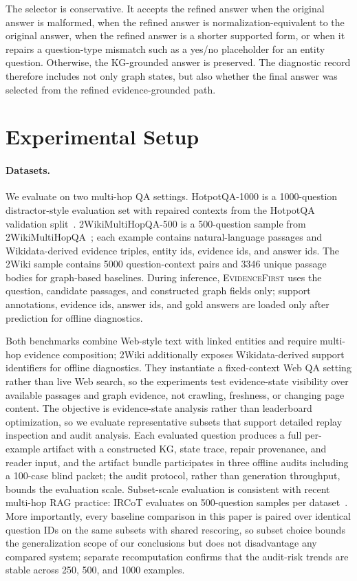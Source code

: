 \documentclass[runningheads,a4paper]{llncs}
\newcommand{\sys}{\textsc{EvidenceFirst}\xspace}
\begin{document}
The selector is conservative. It accepts the refined answer when the original
answer is malformed, when the refined answer is normalization-equivalent to the
original answer, when the refined answer is a shorter supported form, or when it
repairs a question-type mismatch such as a yes/no placeholder for an entity
question. Otherwise, the KG-grounded answer is preserved. The diagnostic record
therefore includes not only graph states, but also whether the final answer was
selected from the refined evidence-grounded path.

\section{Experimental Setup}
\label{sec:setup}

\paragraph{Datasets.}
We evaluate on two multi-hop QA settings. HotpotQA-1000 is a 1000-question
distractor-style evaluation set with repaired contexts from the HotpotQA
validation split~\cite{yang2018hotpotqa}. 2WikiMultiHopQA-500 is a
500-question sample from 2WikiMultiHopQA~\cite{ho2020constructing}; each
example contains natural-language passages and Wikidata-derived evidence
triples, entity ids, evidence ids, and answer ids. The 2Wiki sample contains
5000 question-context pairs and 3346 unique passage bodies for graph-based
baselines. During inference, \sys uses the question, candidate passages, and
constructed graph fields only; support annotations, evidence ids, answer ids,
and gold answers are loaded only after prediction for offline diagnostics.

Both benchmarks combine Web-style text with linked entities and require
multi-hop evidence composition; 2Wiki additionally exposes Wikidata-derived
support identifiers for offline diagnostics. They instantiate a fixed-context
Web QA setting rather than live Web search, so the experiments test
evidence-state visibility over available passages and graph evidence, not crawling,
freshness, or changing page content.
The objective is evidence-state analysis rather than leaderboard optimization,
so we evaluate representative subsets that support detailed replay inspection
and audit analysis. Each evaluated question produces a full per-example artifact
with a constructed KG, state trace, repair provenance, and reader input, and the
artifact bundle participates in three offline audits including a 100-case blind
packet; the audit protocol, rather than generation throughput, bounds the
evaluation scale. Subset-scale evaluation is consistent with recent multi-hop RAG
practice: IRCoT evaluates on 500-question samples per dataset~\cite{trivedi2022ircot}.
More importantly, every baseline comparison in this paper is paired over identical
question IDs on the same subsets with shared rescoring, so subset choice bounds the
generalization scope of our conclusions but does not disadvantage any compared
system; separate recomputation confirms that the audit-risk trends are stable
across 250, 500, and 1000 examples.
\end{document}
